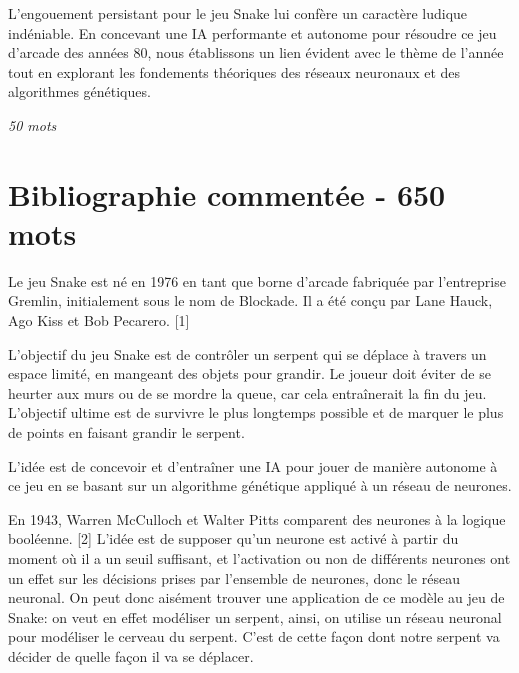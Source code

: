 \documentclass[11pt,a4paper]{article}
\begin{document}
L'engouement persistant pour le jeu Snake lui confère un caractère ludique 
indéniable. En concevant une IA performante et autonome pour résoudre ce jeu 
d'arcade des années 80, nous établissons un lien évident avec le thème de 
l'année tout en explorant les fondements théoriques des réseaux neuronaux et 
des algorithmes génétiques.

\textit{50 mots}

\section{Bibliographie commentée - 650 mots}


Le jeu Snake est né en 1976 en tant que borne d'arcade fabriquée par l'entreprise Gremlin,
 initialement sous le nom de Blockade. Il a été conçu par Lane Hauck, Ago Kiss et Bob Pecarero. [1]


L'objectif du jeu Snake est de contrôler un serpent qui se déplace à travers un espace limité, 
en mangeant des objets pour grandir. Le joueur doit éviter de se heurter aux murs ou de se mordre 
la queue, car cela entraînerait la fin du jeu. L'objectif ultime est de survivre le plus longtemps 
possible et de marquer le plus de points en faisant grandir le serpent.

L'idée est de concevoir et d'entraîner une IA pour jouer de manière autonome à ce jeu en se 
basant sur un algorithme génétique appliqué à un réseau de neurones.





En 1943, Warren McCulloch et Walter Pitts comparent des neurones à la logique booléenne. [2]
L'idée est de supposer qu'un neurone est activé à partir du moment où il a un seuil suffisant,
et l'activation ou non de différents neurones ont un effet sur les décisions prises par l'ensemble
de neurones, donc le réseau neuronal.
On peut donc aisément trouver une application de ce modèle au jeu de Snake: on veut en effet 
modéliser un serpent, ainsi, on utilise un réseau neuronal pour modéliser le cerveau du serpent.
C'est de cette façon dont notre serpent va décider de quelle façon il va se déplacer. 
\end{document}
